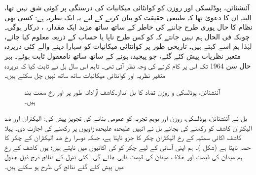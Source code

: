آئنشٹائن، پوڈلسکی اور روزن کو کوانٹائی میکانیات کی درستگی پر کوئی شق نہیں تھا، البتہ ان کا دعویٰ تھا کہ طبیعی حقیقت کو بیان کرنے کے لیے یہ ایک نظریہ ہے: کسی بھی نظام کا حال پوری طرح جاننے کی خاطر  کے ساتھ ساتھ مزید ایک مقدار، ، درکار ہوگی۔ چونکہ فی الحال ہم نہیں جانتے کہ  کو کس طرح ناپا یا حساب کے ذریعہ معلوم کیا جائے، لہٰذا ہم اسے  کہتے ہیں۔ تاریخی طور پر کوانٹائی میکانیات کو سہارا دینے والے کئی درپردہ متغیر نظریات پیش کئے گئے، جو پیچیدہ ہونے کے ساتھ ساتھ نامعقول ثابت ہوئے۔ بہر حال سن \num{1964} تک اس پر کام کرنے کی وجہ نظر آتی تھی۔ تاہم اس سال بل نے ثابت کیا کہ درپردہ متغیر نظریہ اور کوانٹائی میکانیات ساتھ ساتھ نہیں چل سکتے ہیں۔

\begin{figure}
\centering
{}
\caption{آئنشٹائن، پوڈلسکی و روزن تضاد کا بل انداز۔کاشف آزادانہ طور پر  اور  رخ سمت بند ہیں۔}
\label{شکل_بکھراو_بل_انداز}
\end{figure}


بل نے آئنشٹائن، پوڈلسکی، روزن اور بوہم تجربہ کو عمومی بنانے کی تجویز پیش کی: الیکٹران اور ضد الیکٹران کاشف کو  رکھنے کی بجائے بل نے انہیں علیحدہ علیحدہ زاویوں پر رکھنے کی اجازت دی۔ پہلا کاشف اکائی سمتیہ  کے رخ الیکٹران چکر کا جزو ناپتا ہے، جبکہ دوسرا  رخ ضد الیکٹران کے چکر کا حصہ ناپتا ہے (شکل )۔ ہم اپنی آسانی کے لیے چکر کو  کی اکائیوں میں ناپتے ہیں؛ یوں کاشف کے رخ ہم میدان کی قیمت  اور خلاف میدان کی قیمت  ناپی جائے گی۔ کئی  تنزل کے نتائج درج ذیل جدول میں پیش کئے گئے نتائج کی طرح ہو سکتے ہیں۔

